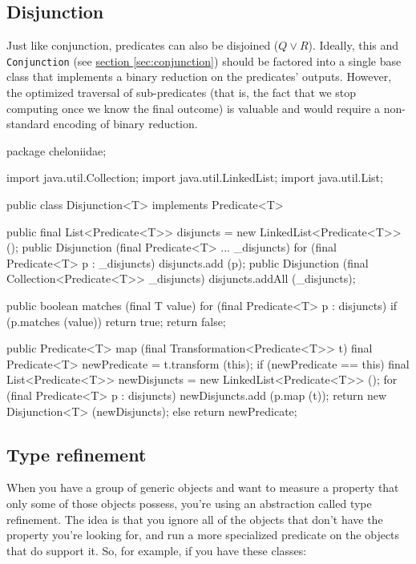 \documentclass{report}
\newcommand{\Ref}[2]{\hyperref[#2]{#1 \ref*{#2}}}
\begin{document}
\subsection {Disjunction} \label{sec:disjunction}
        Just like conjunction, predicates can also be disjoined ($Q \vee R$). Ideally, this and {\tt Conjunction} (see \Ref{section}{sec:conjunction}) should be
        factored into a single base class that implements a binary reduction on the predicates' outputs. However, the optimized traversal of sub-predicates
        (that is, the fact that we stop computing once we know the final outcome) is valuable and would require a non-standard encoding of binary reduction.

\begin{javacode}
package cheloniidae;

import java.util.Collection;
import java.util.LinkedList;
import java.util.List;

public class Disjunction<T> implements Predicate<T> {
  public final List<Predicate<T>> disjuncts = new LinkedList<Predicate<T>> ();
  public Disjunction (final Predicate<T> ... _disjuncts)
    {for (final Predicate<T> p : _disjuncts) disjuncts.add (p);}
  public Disjunction (final Collection<Predicate<T>> _disjuncts) {disjuncts.addAll (_disjuncts);}

  public boolean matches (final T value) {
    for (final Predicate<T> p : disjuncts) if (p.matches (value)) return true;
    return false;
  }

  public Predicate<T> map (final Transformation<Predicate<T>> t) {
    final Predicate<T> newPredicate = t.transform (this);
    if (newPredicate == this) {
      final List<Predicate<T>> newDisjuncts = new LinkedList<Predicate<T>> ();
      for (final Predicate<T> p : disjuncts) newDisjuncts.add (p.map (t));
      return new Disjunction<T> (newDisjuncts);
    } else return newPredicate;
  }
}
\end{javacode}

\subsection {Type refinement} \label{sec:type-refinement}
        When you have a group of generic objects and want to measure a property that only some of those objects possess, you're using an abstraction called type
        refinement. The idea is that you ignore all of the objects that don't have the property you're looking for, and run a more specialized predicate on the
        objects that do support it. So, for example, if you have these classes:
\end{document}
